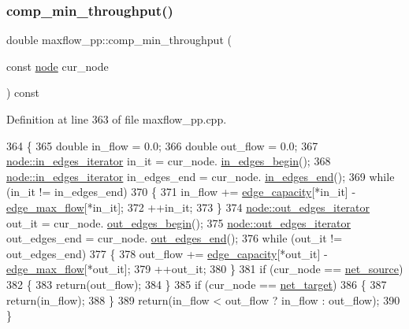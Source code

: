 \subsubsection{\texorpdfstring{comp\+\_\+min\+\_\+throughput()}{comp\_min\_throughput()}}
{\footnotesize\ttfamily double maxflow\+\_\+pp\+::comp\+\_\+min\+\_\+throughput (\begin{DoxyParamCaption}\item[{const \mbox{\hyperlink{classnode}{node}}}]{cur\+\_\+node }\end{DoxyParamCaption}) const\hspace{0.3cm}{\ttfamily [protected]}}



Definition at line 363 of file maxflow\+\_\+pp.\+cpp.


\begin{DoxyCode}
364 \{
365     \textcolor{keywordtype}{double} in\_flow = 0.0;
366     \textcolor{keywordtype}{double} out\_flow = 0.0;
367     \mbox{\hyperlink{classnode_a9a96be92add7c1a2771bcd0431ebf8ab}{node::in\_edges\_iterator}} in\_it = cur\_node.
      \mbox{\hyperlink{classnode_a0c32377f370ae52ed2134ff8d4dac584}{in\_edges\_begin}}();
368     \mbox{\hyperlink{classnode_a9a96be92add7c1a2771bcd0431ebf8ab}{node::in\_edges\_iterator}} in\_edges\_end = cur\_node.
      \mbox{\hyperlink{classnode_a785cd330f8b4c5c47d3b6e936a7e744e}{in\_edges\_end}}();
369     \textcolor{keywordflow}{while} (in\_it != in\_edges\_end)
370     \{
371     in\_flow += \mbox{\hyperlink{classmaxflow__pp_af3cdc4999a86322271a80b1855d58629}{edge\_capacity}}[*in\_it] - \mbox{\hyperlink{classmaxflow__pp_a25d5bb2ab6c775a634dacf408ff55a83}{edge\_max\_flow}}[*in\_it];
372     ++in\_it;
373     \}
374     \mbox{\hyperlink{classnode_a90e17ed34de55072e8077f4367499a98}{node::out\_edges\_iterator}} out\_it = cur\_node.
      \mbox{\hyperlink{classnode_a7dcb80df22118cea04f77ca8c952d9c2}{out\_edges\_begin}}();
375     \mbox{\hyperlink{classnode_a90e17ed34de55072e8077f4367499a98}{node::out\_edges\_iterator}} out\_edges\_end = cur\_node.
      \mbox{\hyperlink{classnode_a7ce2ba5195a63d4df6b44299a02a9378}{out\_edges\_end}}();
376     \textcolor{keywordflow}{while} (out\_it != out\_edges\_end)
377     \{
378     out\_flow += \mbox{\hyperlink{classmaxflow__pp_af3cdc4999a86322271a80b1855d58629}{edge\_capacity}}[*out\_it] - \mbox{\hyperlink{classmaxflow__pp_a25d5bb2ab6c775a634dacf408ff55a83}{edge\_max\_flow}}[*out\_it];
379     ++out\_it;
380     \}
381     \textcolor{keywordflow}{if} (cur\_node == \mbox{\hyperlink{classmaxflow__pp_a20f2d05465acc2d7b777ea8025d12003}{net\_source}})
382     \{
383     \textcolor{keywordflow}{return}(out\_flow);
384     \}
385     \textcolor{keywordflow}{if} (cur\_node == \mbox{\hyperlink{classmaxflow__pp_a10f0b047011e04cb4816a824da5b7892}{net\_target}})
386     \{
387     \textcolor{keywordflow}{return}(in\_flow);
388     \}
389     \textcolor{keywordflow}{return}(in\_flow < out\_flow ? in\_flow : out\_flow);
390 \}
\end{DoxyCode}
